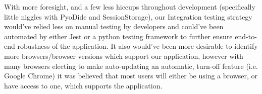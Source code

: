With more foresight, and a few less hiccups throughout development (specifically little niggles with PyoDide and SessionStorage), our Integration testing strategy would've relied less on manual testing by developers and could've been automated by either Jest or a python testing framework to further ensure end-to-end robustness of the application. It also would've been more desirable to identify more browsers/browser versions which support our application, however with many browsers electing to make auto-updating an automatic, turn-off feature (i.e. Google Chrome) it was believed that most users will either be using a browser, or have access to one, which supports the application.